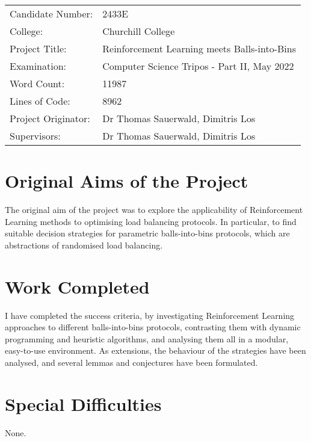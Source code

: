
\begin{proforma}      


\begin{table}[h]
\begin{tabular}{ll}
Candidate Number:  & 2433E \\
College: & Churchill College \\
Project Title:    &  Reinforcement Learning meets Balls-into-Bins  \\
Examination:  & Computer Science Tripos - Part II, May 2022   \\
Word Count:  & 11987  \protect\footnotemark[1]\\
Lines of Code: & 8962 \protect\footnotemark[2] \\
Project Originator: & Dr Thomas Sauerwald, Dimitris Los \\
Supervisors: & Dr Thomas Sauerwald, Dimitris Los 
\end{tabular}
\end{table}



\section*{Original Aims of the Project}

The original aim of the project was to explore the applicability of Reinforcement Learning methods to optimising load balancing protocols. In particular, to find suitable decision strategies for parametric balls-into-bins protocols, which are abstractions of randomised load balancing.

\section*{Work Completed}

I have completed the success criteria, by investigating Reinforcement Learning approaches to different balls-into-bins protocols, contrasting them with dynamic programming and heuristic algorithms, and analysing them all in a modular, easy-to-use environment. As extensions, the behaviour of the strategies have been analysed, and several lemmas and conjectures have been formulated.

\section*{Special Difficulties}

None.

\end{proforma}
